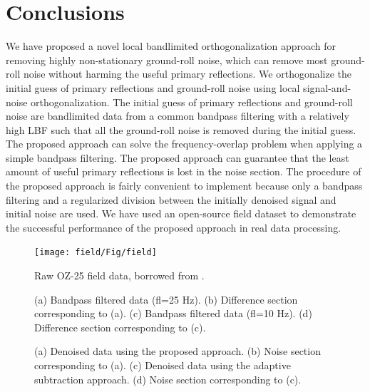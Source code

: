 \section{Conclusions}
We have proposed a novel local bandlimited  orthogonalization approach for removing highly non-stationary ground-roll noise, which can remove most ground-roll noise without harming the useful primary reflections. We orthogonalize the initial guess of primary reflections and ground-roll noise using local signal-and-noise orthogonalization. The initial guess of primary reflections and ground-roll noise are bandlimited data from a common bandpass filtering with a relatively high LBF such that all the ground-roll noise is removed during the initial guess. The proposed approach can solve the frequency-overlap problem when applying a simple bandpass filtering. The proposed approach can guarantee that the least amount of useful primary reflections is lost in the noise section. The procedure of the proposed approach is fairly convenient to implement because only a bandpass filtering and a regularized division between the initially denoised signal and initial noise are used. We have used an open-source field dataset to demonstrate the successful performance of the proposed approach in real data processing. 


\begin{figure}[htb!]
  \centering
    \texttt{[image: field/Fig/field]}
	\caption{Raw OZ-25 field data, borrowed from \cite{carson2006}.}
   \label{fig:field}
\end{figure}

\begin{figure}[htb!]
  \centering
	\caption{(a) Bandpass filtered data (fl=25 Hz). (b) Difference section corresponding to (a). (c) Bandpass filtered data (fl=10 Hz). (d) Difference section corresponding to (c).}
   \label{fig:field-1-0,dif-1-0,field-2-0,dif-2-0}
\end{figure}

\begin{figure}[htb!]
  \centering
	\caption{(a) Denoised data using the proposed approach. (b) Noise section corresponding to (a). (c) Denoised data using the adaptive subtraction approach. (d) Noise section corresponding to (c).}
   \label{fig:field-ortho-0,dif-ortho-0,field-3-0,dif-3-0}
\end{figure}

